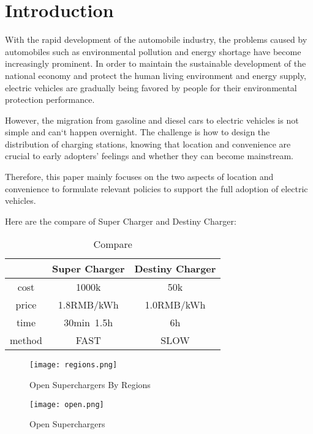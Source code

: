 \documentclass{mcmthesis}
\begin{document}
\maketitle
\section{Introduction}
With the rapid development of the automobile industry, the problems caused by automobiles such as environmental pollution and energy shortage have become increasingly prominent. In order to maintain the sustainable development of the national economy and protect the human living environment and energy supply, electric vehicles are gradually being favored by people for their environmental protection performance.
   
   However, the migration from gasoline and diesel cars to electric vehicles is not simple and can`t happen overnight. The challenge is how to design the distribution of charging stations, knowing that location and convenience are crucial to early adopters' feelings and whether they can become mainstream.
   
   Therefore, this paper mainly focuses on the two aspects of location and convenience to formulate relevant policies to support the full adoption of electric vehicles.

Here are the compare of Super Charger and Destiny Charger:

\begin{table}[!htbp]
\centering
\begin{tabular}{|c|c|c|}
\hline
 &Super Charger&Destiny Charger \\
\hline
cost&1000k&50k\\
\hline
price& 1.8RMB/kWh& 1.0RMB/kWh\\
\hline
time& 30min~1.5h& 6h\\
\hline
method&FAST &SLOW \\
\hline
\end{tabular}
\caption{Compare}
\end{table}

\begin{figure}[htbp]
\small
\centering
\texttt{[image: regions.png]}
\caption{Open Superchargers By Regions} 
\end{figure}


\begin{figure}[htbp]
\small
\centering
\texttt{[image: open.png]}
\caption{Open Superchargers} 
\end{figure}
\end{document}

